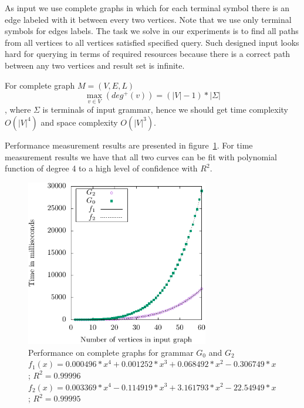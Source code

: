As input we use complete graphs in which for each terminal symbol there is an edge labeled with it between every two vertices.
Note that we use only terminal symbols for edges labels.  
The task we solve in our experiments is to find all paths from all vertices to all vertices satisfied specified query.
Such designed input looks hard for querying in terms of required resources because there is a correct path between any two vertices and result set is infinite.

For complete graph $M=(V,E,L)$ $$\max\limits_{v \in V}\left(deg^+\left(v\right)\right) = (|V| - 1)*|\Sigma|$$, where $\Sigma$ is terminals of input grammar, hence we should get time complexity $O(|V|^4)$ and space complexity $O(|V|^3)$.

Performance measurement results are presented in figure~\ref{pic:Perf}. 
For time measurement results we have that all two curves can be fit with polynomial function of degree 4 to a high level of confidence with $R^2$. 


\begin{figure}[ht]
\centering



 \includegraphics[width=8cm]{dot/grph1.pdf}
\caption{Performance on complete graphs for grammar $G_0$ and $G_2$ \\ 
$f_1(x) = 0.000496*x^4 + 0.001252*x^3 + 0.068492*x^2 - 0.306749*x$; $R^2 = 0.99996$ \\
$f_2(x) = 0.003369*x^4 - 0.114919*x^3 + 3.161793*x^2 - 22.54949*x$; $R^2 = 0.99995$}
\label{pic:Perf}
\end{figure}

